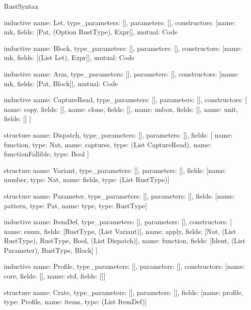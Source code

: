 \begin{lexlean}{RustSyntax}
\begin{semanticmodule}
inductive{
  name: Let,
  type_parameters: [],
  parameters: [],
  constructors: [{name: mk, fields: [Pat, (Option RustType), Expr]}],
  mutual: Code
}

inductive{
  name: Block,
  type_parameters: [],
  parameters: [],
  constructors: [{name: mk, fields: [(List Let), Expr]}],
  mutual: Code
}

inductive{
  name: Arm,
  type_parameters: [],
  parameters: [],
  constructors: [{name: mk, fields: [Pat, Block]}],
  mutual: Code
}

inductive{
  name: CaptureRead,
  type_parameters: [],
  parameters: [],
  constructors: [
    {name: copy, fields: []},
    {name: clone, fields: []},
    {name: unbox, fields: []},
    {name: unit, fields: []}
  ]
}

structure{
  name: Dispatch,
  type_parameters: [],
  parameters: [],
  fields: [
    {name: function, type: Nat},
    {name: captures, type: (List CaptureRead)},
    {name: functionFallible, type: Bool}
  ]
}

structure{
  name: Variant,
  type_parameters: [],
  parameters: [],
  fields: [{name: number, type: Nat}, {name: fields, type: (List RustType)}]
}

structure{
  name: Parameter,
  type_parameters: [],
  parameters: [],
  fields: [{name: pattern, type: Pat}, {name: type, type: RustType}]
}

inductive{
  name: ItemDef,
  type_parameters: [],
  parameters: [],
  constructors: [
    {name: enum, fields: [RustType, (List Variant)]},
    {name: apply, fields: [Nat, (List RustType), RustType, Bool, (List Dispatch)]},
    {name: function, fields: [Ident, (List Parameter), RustType, Block]}
  ]
}

inductive{
  name: Profile,
  type_parameters: [],
  parameters: [],
  constructors: [{name: core, fields: []}, {name: std, fields: []}]
}

structure{
  name: Crate,
  type_parameters: [],
  parameters: [],
  fields: [{name: profile, type: Profile}, {name: items, type: (List ItemDef)}]
}
\end{semanticmodule}
\end{lexlean}
